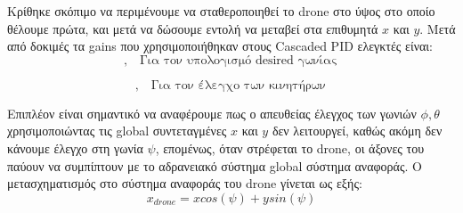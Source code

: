\documentclass[a4paper,12pt]{article}
\begin{document}
\noindent
Κρίθηκε σκόπιμο να περιμένουμε να σταθεροποιηθεί το drone στο ύψος στο οποίο θέλουμε πρώτα, και μετά να δώσουμε εντολή να μεταβεί στα επιθυμητά $x$ και $y$. Μετά από δοκιμές τα gains που χρησιμοποιήθηκαν στους Cascaded PID ελεγκτές είναι:
\begin{equation}
    [K_p = 1, K_i = 0, K_d = 0.7],   \quad \textrm{Για τον υπολογισμό desired γωνίας}
\end{equation}

\begin{equation}
    [K_p = 2.95, K_i = 0.5, K_d = 2.6],   \quad \textrm{Για τον έλεγχο των κινητήρων}
\end{equation}

\noindent
Επιπλέον είναι σημαντικό να αναφέρουμε πως ο απευθείας έλεγχος των γωνιών $\phi, \theta$ χρησιμοποιώντας τις global συντεταγμένες $x$ και $y$ δεν λειτουργεί, καθώς ακόμη δεν κάνουμε έλεγχο στη γωνία $\psi$, επομένως, όταν στρέφεται το drone, οι άξονες του παύουν να συμπίπτουν με το αδρανειακό σύστημα global σύστημα αναφοράς. 
\newline
\newline
Ο μετασχηματισμός στο σύστημα αναφοράς του drone γίνεται ως εξής:
\begin{equation}
    x_{drone} = xcos(\psi)+ysin(\psi)
\end{equation}
\end{document}
